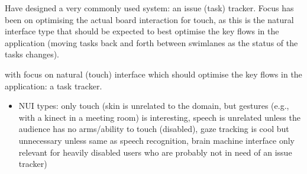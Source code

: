 Have designed a very commonly used system: an issue (task) tracker. Focus has been on optimising the actual board interaction for touch, as this is the natural interface type that should be expected to best optimise the key flows in the application (moving tasks back and forth between swimlanes as the status of the tasks changes).

with focus on natural (touch) interface which should optimise the key flows in the application: a task tracker.

\begin{itemize}
  \item NUI types: only touch (skin is unrelated to the domain, but gestures (e.g., with a kinect in a meeting room) is interesting, speech is unrelated unless the audience has no arms/ability to touch (disabled), gaze tracking is cool but unnecessary unless same as speech recognition, brain machine interface only relevant for heavily disabled users who are probably not in need of an issue tracker)
\end{itemize}
